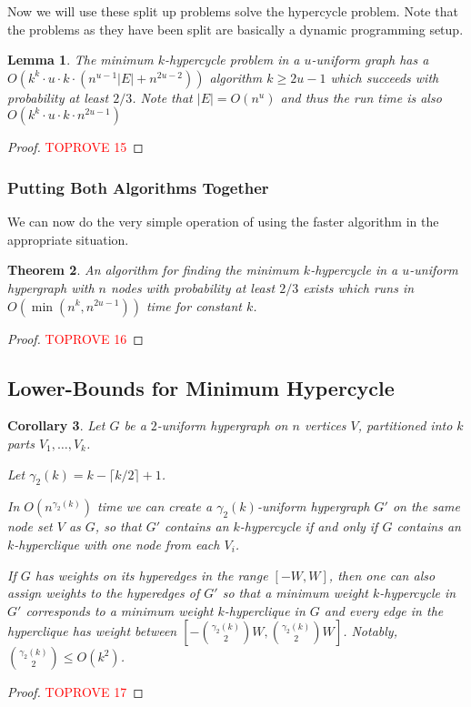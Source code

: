 \documentclass[11pt,letterpaper,pdftex]{article}
\newtheorem{theorem}{Theorem}[section]
\newtheorem{lemma}[theorem]{Lemma}
\newtheorem{corollary}[theorem]{Corollary}
\begin{document}
Now we will use these split up problems solve the hypercycle problem. Note that the problems as they have been split are basically a dynamic programming setup.
\begin{lemma}
    The minimum $k$-hypercycle problem in a $u$-uniform graph has a  $O(k^k \cdot u \cdot k \cdot (n^{u-1}|E| + n^{2u-2}))$ algorithm $k \geq 2u-1$ which succeeds with probability at least $2/3$. Note that $|E| = O(n^u)$ and thus the run time is also $O(k^k \cdot u \cdot k \cdot n^{2u-1})$
    \label{lem:longweightedkhypercyclealg}
\end{lemma}
\begin{proof}\textcolor{red}{TOPROVE 15}\end{proof}

\subsubsection{Putting Both Algorithms Together}
We can now do the very simple operation of using the faster algorithm in the appropriate situation. 

\begin{theorem}
    An algorithm for finding the minimum $k$-hypercycle in a $u$-uniform hypergraph with $n$ nodes with probability at least $2/3$ exists which runs in $O\left(\min(n^k, n^{2u-1})\right)$ time for constant $k$.
\end{theorem}
\begin{proof}\textcolor{red}{TOPROVE 16}\end{proof}

\subsection{Lower-Bounds for Minimum Hypercycle}

\begin{corollary}
    Let $G$ be a $2$-uniform hypergraph on $n$ vertices $V$, partitioned into $k$ parts $V_1,\ldots,V_k$. 
    
    Let $\gamma_2(k)=k-\lceil k/2\rceil +1$.
    
    In $O(n^{\gamma_2(k)})$ time we can create a $\gamma_2(k)$-uniform hypergraph $G'$ on the same node set $V$ as $G$, so that $G'$ contains an $k$-hypercycle if and only if $G$ contains an $k$-hyperclique with one node from each $V_i$.
    
    If $G$ has weights on its hyperedges in the range $[-W,W]$, then one can also assign weights to the hyperedges of $G'$ so that a minimum weight $k$-hypercycle in $G'$ corresponds to a minimum weight $k$-hyperclique in $G$ and every edge in the hyperclique has weight between $[-\binom{\gamma_2(k)}{2}W,\binom{\gamma_2(k)}{2}W]$. Notably, $\binom{\gamma_2(k)}{2}\leq O(k^2)$.
\end{corollary}
\begin{proof}\textcolor{red}{TOPROVE 17}\end{proof}
\end{document}
